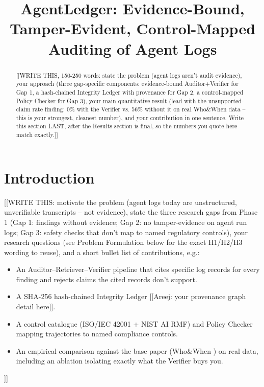 \documentclass[conference]{IEEEtran}
\begin{document}
\title{AgentLedger: Evidence-Bound, Tamper-Evident, Control-Mapped Auditing of Agent Logs}

\author{
\and
{}
}

\maketitle

\begin{abstract}
[[WRITE THIS, 150-250 words: state the problem (agent logs aren't audit
evidence), your approach (three gap-specific components: evidence-bound
Auditor+Verifier for Gap 1, a hash-chained Integrity Ledger with provenance
for Gap 2, a control-mapped Policy Checker for Gap 3), your main
quantitative result (lead with the unsupported-claim rate finding: 0\% with
the Verifier vs. 56\% without it on real Who\&When data -- this is your
strongest, cleanest number), and your contribution in one sentence. Write
this section LAST, after the Results section is final, so the numbers you
quote here match exactly.]]
\end{abstract}

\section{Introduction}
[[WRITE THIS: motivate the problem (agent logs today are unstructured,
unverifiable transcripts -- not evidence), state the three research gaps
from Phase 1 (Gap 1: findings without evidence; Gap 2: no tamper-evidence
on agent run logs; Gap 3: safety checks that don't map to named regulatory
controls), your research questions (see Problem Formulation below for the
exact H1/H2/H3 wording to reuse), and a short bullet list of contributions,
e.g.:
\begin{itemize}
  \item An Auditor--Retriever--Verifier pipeline that cites specific log
    records for every finding and rejects claims the cited records don't
    support.
  \item A SHA-256 hash-chained Integrity Ledger [[Areej: your provenance
    graph detail here]].
  \item A control catalogue (ISO/IEC 42001 + NIST AI RMF) and Policy
    Checker mapping trajectories to named compliance controls.
  \item An empirical comparison against the base paper (Who\&When
    \cite{zhang2025whowhen}) on real data, including an ablation isolating
    exactly what the Verifier buys you.
\end{itemize}
]]
\end{document}
